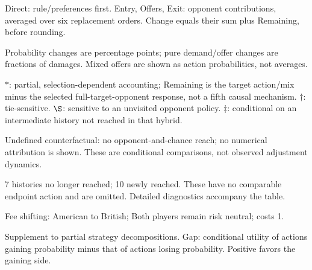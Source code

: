 \documentclass[10pt]{article}
\begin{document}
{\footnotesize Direct: rule/preferences first. Entry, Offers, Exit: opponent contributions, averaged over six replacement orders. Change equals their sum plus Remaining, before rounding.\par
Probability changes are percentage points; pure demand/offer changes are fractions of damages. Mixed offers are shown as action probabilities, not averages.\par
$*$: partial, selection-dependent accounting; Remaining is the target action/mix minus the selected full-target-opponent response, not a fifth causal mechanism. $\dagger$: tie-sensitive. $\S$: sensitive to an unvisited opponent policy. $\ddagger$: conditional on an intermediate history not reached in that hybrid.\par
Undefined counterfactual: no opponent-and-chance reach; no numerical attribution is shown. These are conditional comparisons, not observed adjustment dynamics.\par
7 histories no longer reached; 10 newly reached. These have no comparable endpoint action and are omitted. Detailed diagnostics accompany the table.}\par
{}\par
Fee shifting: American to British; Both players remain risk neutral; costs 1.\par
{\small Supplement to partial strategy decompositions. Gap: conditional utility of actions gaining probability minus that of actions losing probability. Positive favors the gaining side.}\par
\end{document}
